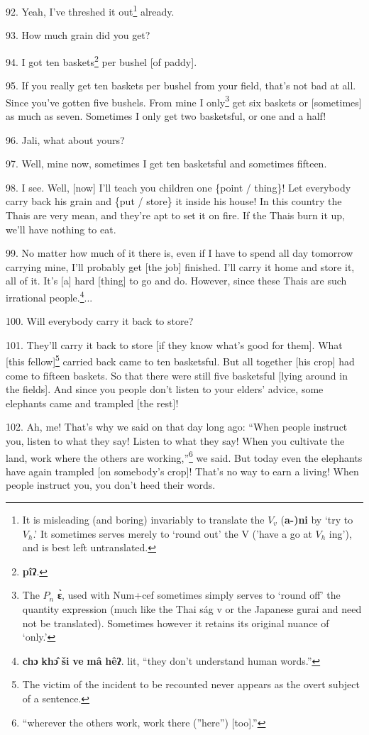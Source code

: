 92. Yeah, I've threshed it out\footnote{It is misleading (and boring) invariably to translate the $V_v$ (\textbf{a-)ni} by `try to $V_h$.' It sometimes serves merely to `round out' the V ('have a go at $V_h$ ing'), and is best left untranslated.} already.

93. How much grain did you get?

94. I got ten baskets\footnote{\textbf{pîʔ}.} per bushel [of paddy].

95. If you really get ten baskets per bushel from your field, that's not bad at
all. Since you've gotten five bushels. From mine I only\footnote{The $P_n$ \textbf{ɛ̀}, used with Num+cef sometimes simply serves to `round off' the quantity expression (much like the Thai ság v or the Japanese gurai and need not be translated). Sometimes however it retains its original nuance of `only.'} get six baskets or
[sometimes] as much as seven. Sometimes I only get two basketsful, or one and a
half!

96. Jali, what about yours?

97. Well, mine now, sometimes I get ten basketsful and sometimes fifteen.

98. I see. Well, [now] I'll teach you children one \{point / thing\}! Let everybody
carry back his grain and \{put / store\} it inside his house! In this country the
Thais are very mean, and they're apt to set it on fire. If the Thais burn it up,
we'll have nothing to eat.

99. No matter how much of it there is, even if I have to spend all day tomorrow
carrying mine, I'll probably get [the job] finished. I'll carry it home and store
it, all of it. It's [a] hard [thing] to go and do. However, since these Thais are
such irrational people.\footnote{\textbf{chɔ} \textbf{khɔ̂} \textbf{ši} \textbf{ve} \textbf{mâ} \textbf{hêʔ}. lit, ``they don't understand human words.''}...

100. Will everybody carry it back to store?

101. They'll carry it back to store [if they know what's good for them]. What [this
fellow]\footnote{The victim of the incident to be recounted never appears as the overt subject of a sentence.}\textbf{ }carried back came to ten basketsful. But all together [his
crop] had come to fifteen baskets. So that there were still five basketsful [lying
around in the fields]. And since you people don't listen to your elders' advice,
some elephants came and trampled [the rest]!

102. Ah, me! That's why we said on that day long ago: ``When people instruct
you, listen to what they say! Listen to what they say! When you cultivate the land,
work where the others are working,''\footnote{``wherever the others work, work there (''here'') [too].''} we said. But today even the elephants
have again trampled [on somebody's crop]! That's no way to earn a living! When
people instruct you, you don't heed their words.

